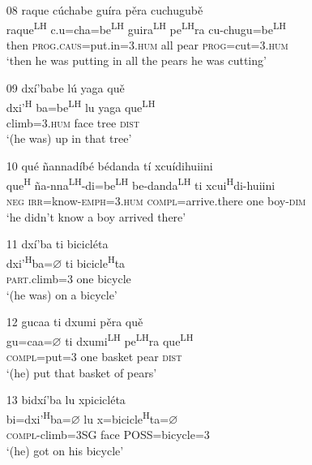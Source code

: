 \begin{itemize}
\item[08]
\glll raque c\'{u}chabe gu\'{i}ra p\v{e}ra cuchugub\v{e} \\
raque\textsuperscript{LH} c.u=cha=be\textsuperscript{LH}  guira\textsuperscript{LH} pe\textsuperscript{LH}ra cu-chugu=be\textsuperscript{LH}  \\
then \textsc{prog}.\textsc{caus}=put.in=\textsc{3.hum} all pear \textsc{prog}=cut=\textsc{3.hum} \\
\glt `then he was putting in all the pears he was cutting'


\item[09]
\glll dx\'{i}'babe l\'{u} yaga qu\v{e} \\
dxi'\textsuperscript{H} ba=be\textsuperscript{LH}  lu yaga que\textsuperscript{LH} \\
climb=\textsc{3.hum} face tree \textsc{dist} \\
\glt `(he was) up in that tree'


\item[10]
\glll qu\'{e} \~{n}annad\'{i}b\'{e} b\'{e}danda t\'{i} xcu\'{i}dihuiini \\
que\textsuperscript{H} \~{n}a-nna\textsuperscript{LH}-di=be\textsuperscript{LH}  be-danda\textsuperscript{LH} ti xcui\textsuperscript{H}di-huiini \\
\textsc{neg} \textsc{irr}=know-\textsc{emph}=\textsc{3.hum} \textsc{compl}=arrive.there one boy-\textsc{dim} \\
\glt `he didn't know a boy arrived there'
 

\item[11]
\glll dx\'{i}'ba ti bicicl\'{e}ta  \\
dxi'\textsuperscript{H}ba={$\varnothing$} ti bicicle\textsuperscript{H}ta  \\
\textsc{part}.climb=\textsc{3} one bicycle  \\
\glt `(he was) on a bicycle'


\item[12]
\glll gucaa ti dxumi p\v{e}ra qu\v{e} \\
gu=caa={$\varnothing$} ti dxumi\textsuperscript{LH} pe\textsuperscript{LH}ra que\textsuperscript{LH} \\
\textsc{compl}=put=\textsc{3} one basket pear \textsc{dist} \\
\glt `(he) put that basket of pears'


\item[13]
\glll bidx\'{i}'ba lu xpicicl\'{e}ta \\
bi=dxi'\textsuperscript{H}ba={$\varnothing$} lu x=bicicle\textsuperscript{H}ta={$\varnothing$}  \\
\textsc{compl}-climb=3SG face POSS=bicycle=\textsc{3} \\
\glt `(he) got on his bicycle'


\end{itemize}
